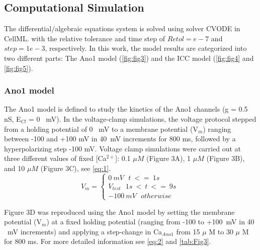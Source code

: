 \documentclass[fleqn,10pt]{physiome}
\begin{document}
\subsection{Computational Simulation}
\label{Computational-Simulation}
The differential$/$algebraic equations system is solved using solver CVODE in CellML. 
with the relative tolerance and time step of $Retol=e-7$ and $step =1e-3$, respectively. 
In this work, the model results are categorized into two different parts: The Ano1 model (\autoref{fig:fig3}) and the ICC model (\autoref{fig:fig4} and \autoref{fig:fig5}).

\subsubsection{Ano1 model}
\label{IAno1-model}
The Ano1 model is defined to study the kinetics of the Ano1 channels (g = 0.5 nS, E$_{Cl}$ = 0 \ mV). In the voltage-clamp simulations, the voltage protocol stepped from a holding potential of 0 \ mV to a membrane potential (V$_{m}$) ranging between -100 and +100 mV in 40\ mV increments for 800 ms, followed by a hyperpolarizing step -100 mV. Voltage clamp simulations were carried out at three different values of ﬁxed [Ca$^{2+}$]: 0.1 $\mu M$ (Figure 3A), 1 $\mu M$  (Figure 3B), and 10 $\mu M$  (Figure 3C), see \autoref{eq:1}.
\begin{equation}
  V_{m} =
  \begin{cases}
   0  \ mV \ \ \ t \ <= \ 1s  \  \  \ \  \\  
   V_{test}  \  \ \ 1s\ < \ t \ <= \ 9s \ \\  \label{eq:1}
   -100  \ mV  \ \  \ otherwise  \ \ 
  \end{cases}
\end{equation}

Figure 3D was reproduced using the Ano1 model by setting the membrane potential (V$_{m}$) at a fixed holding potential (ranging from -100 to +100\ mV in 40 \ mV increments) and applying a step-change in Ca$_{Ano1}$ from 15 $\mu$ M to 30 $\mu$ M  for 800 ms. For more detailed information see \autoref{eq:2} and \autoref{tab:Fig3}. 
\end{document}

